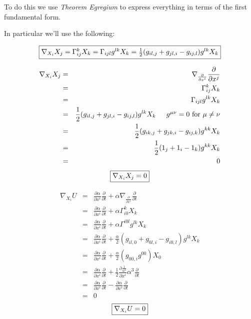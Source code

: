 To do this we use \emph{Theorem Egregium} to express everything in terms of the first fundamental form.

In particular we'll use the following:

\begin{equation}
\framebox{$\nabla_{X_i}X_j = \Gamma^k_{ij}X_k = \Gamma_{ijl}g^{lk}X_k = \frac{1}{2}(g_{il,j}+g_{jl,i}-g_{ij,l})g^{lk}X_k$}
\end{equation}

\begin{eqnarray}
\nonumber
\nabla_{X_i}X_j &=& \nabla_{\frac{\partial}{\partial x^i}}\frac{\partial}{\partial x^j} \\
\nonumber 
&=& \Gamma_{ij}^kX_k \\
\nonumber
&=& \Gamma_{ijl}g^{lk}X_k \\
\nonumber
&=& \frac{1}{2}(g_{il,j}+g_{jl,i}-g_{ij,l})g^{lk}X_k \mbox{\, \, \, $g^{\mu\nu}=0$ for $\mu \neq \nu$}\\
\nonumber
&=& \frac{1}{2}(g_{ik,j}+g_{jk,i}-g_{ij,k})g^{kk}X_k \\
\nonumber
&=& \frac{1}{2}(1_j+1_i-1_k)g^{kk}X_k \\
\nonumber
&=& 0
\end{eqnarray}
\begin{equation}
\framebox{$\nabla_{X_i}X_j = 0$}
\label{nXX}
\end{equation}

\begin{eqnarray}
\nonumber
\nabla_{X_i}U &=& \frac{\partial \alpha }{\partial x^i}  \frac{\partial}{\partial t} + \alpha \nabla_{\frac{\partial}{\partial x^i}}{\frac{\partial}{\partial t}} \\
\nonumber
&=& \frac{\partial \alpha }{\partial x^i}  \frac{\partial}{\partial t} + \alpha \Gamma^k_{i0}X_k \\
\nonumber
&=& \frac{\partial \alpha }{\partial x^i}  \frac{\partial}{\partial t} + \alpha \Gamma^{i0l}g^{lk}X_k \\
\nonumber
&=& \frac{\partial \alpha }{\partial x^i}  \frac{\partial}{\partial t} + \frac{\alpha}{2}(g_{il,0}+g_{0l,i}-g_{i0,l})g^{lk}X_k \\
\nonumber
&=& \frac{\partial \alpha }{\partial x^i}  \frac{\partial}{\partial t} + \frac{\alpha}{2}(g_{00,i}g^{00})X_0 \\
\nonumber
&=& \frac{\partial \alpha }{\partial x^i} \frac{\partial}{\partial t} + \frac{1}{2}\frac{\partial \frac{1}{\alpha^2}} {\partial x^i}\alpha^3\frac{\partial}{\partial t} \\
\nonumber
&=& \frac{\partial \alpha }{\partial x^i} \frac{\partial}{\partial t} - \frac{\partial \alpha} {\partial x^i}\frac{\partial}{\partial t} \\
\nonumber
&=& 0
\end{eqnarray}
\begin{equation}
\framebox{$\nabla_{X_i}U = 0$}
\label{nXU}
\end{equation}

